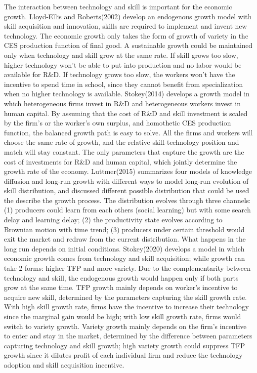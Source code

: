 \documentclass{article}
\newcommand{\1}{\mathbb{1}}
\begin{document}
The interaction between technology and skill is important for the economic growth. 
Lloyd-Ellis and Roberts(2002)\cite{Lloyd-EllisRoberts2002} develop an endogenous growth model with skill acquisition and innovation, skills are required to implement and invent new technology. The economic growth only takes the form of growth of variety in the CES production function of final good. A sustainable growth could be maintained only when technology and skill grow at the same rate. If skill grows too slow, higher technology won't be able to put into production and no labor would be available for R\&D. If technology grows too slow, the workers won't have the incentive to spend time in school, since they cannot benefit from specialization when no higher technology is available.
Stokey(2014)\cite{Stokey2014} develops a growth model in which heterogeneous firms invest in R\&D and heterogeneous workers invest in human capital. By assuming that the cost of R\&D and skill investment is scaled by the firm's or the worker's own surplus, and homothetic CES production function, the balanced growth path is easy to solve. All the firms and workers will choose the same rate of growth, and the relative skill-technology position and match will stay constant. The only parameters that capture the growth are the cost of investments for R\&D and human capital, which jointly determine the growth rate of the economy. 
Luttmer(2015)\cite{Luttmer2015} summarizes four models of knowledge diffusion and long-run growth with different ways to model long-run evolution of skill distribution, and discussed different possible distribution that could be used the describe the growth process. The distribution evolves through three channels: (1) producers could learn from each others (social learning) but with some search delay and learning delay; (2) the productivity state evolves according to Brownian motion with time trend; (3) producers under certain threshold would exit the market and redraw from the current distribution. What happens in the long run depends on initial conditions.
Stokey(2020)\cite{Stokey2020} develops a model in which economic growth comes from technology and skill acquisition; while growth can take 2 forms: higher TFP and more variety. Due to the complementarity between technology and skill, the endogenous growth would happen only if both parts grow at the same time. TFP growth mainly depends on worker's incentive to acquire new skill, determined by the parameters capturing the skill growth rate. With high skill growth rate, firms have the incentive to increase their technology since the marginal gain would be high; with low skill growth rate, firms would switch to variety growth. Variety growth mainly depends on the firm's incentive to enter and stay in the market, determined by the difference between parameters capturing technology and skill growth; high variety growth could suppress TFP growth since it dilutes profit of each individual firm and reduce the technology adoption and skill acquisition incentive. 
\end{document}
